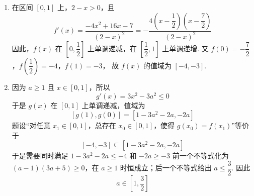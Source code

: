 \begin{solution}
\begin{enumerate}
\item 在区间 \([0,1]\) 上，\(2-x>0\)，且
\[
f'(x)=\frac{-4x^{2}+16x-7}{(2-x)^{2}}=-\frac{4\left(x-\dfrac12\right)\left(x-\dfrac72\right)}{(2-x)^{2}}
\]
因此，\(f(x)\) 在 \(\left[0,\dfrac12\right]\) 上单调递减，在 \(\left[\dfrac12,1\right]\) 上单调递增. 又
\(f(0)=-\dfrac72\)，\(f\left(\dfrac12\right)=-4\)，\(f(1)=-3\)，
故 \(f(x)\) 的值域为 \([-4,-3]\).

\item 因为 \(a\geqslant1\) 且 \(x\in[0,1]\)，所以
\[
g'(x)=3x^{2}-3a^{2}\leqslant0
\]
于是 \(g(x)\) 在 \([0,1]\) 上单调递减，值域为
\[
\left[g(1),g(0)\right]=\left[1-3a^{2}-2a,-2a\right]
\]
题设“对任意 \(x_{1}\in[0,1]\)，总存在 \(x_{0}\in[0,1]\)，使得 \(g(x_{0})=f(x_{1})\)”等价于
\[
[-4,-3]\subseteq\left[1-3a^{2}-2a,-2a\right]
\]
于是需要同时满足
\(1-3a^{2}-2a\leqslant-4\) 和 \(-2a\geqslant-3\)
前一个不等式化为 \((a-1)(3a+5)\geqslant0\)，在 \(a\geqslant1\) 时恒成立；后一个不等式给出 \(a\leqslant\dfrac32\). 因此
\[
a\in\left[1,\dfrac32\right]
\]
\end{enumerate}
\end{solution}
